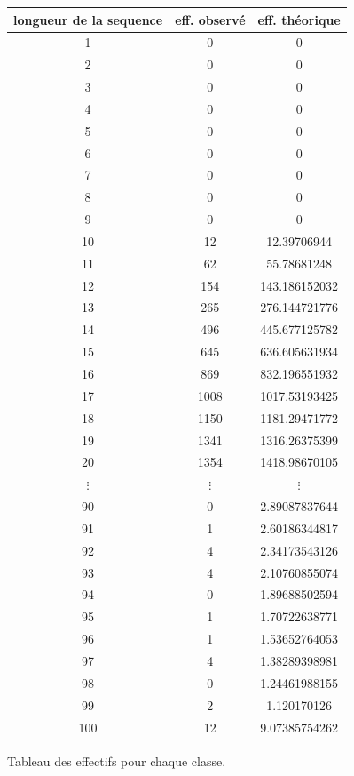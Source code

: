 \documentclass[10pt,a4paper]{article}
\begin{document}
\begin{figure}[H]
\begin{center}
\begin{longtable}{|c|c|c|}
\hline
longueur de la sequence & eff. observé & eff. théorique\\
\hline
1 & 0 & 0 \\
2 & 0 & 0 \\
3 & 0 & 0 \\
4 & 0 & 0 \\
5 & 0 & 0 \\
6 & 0 & 0 \\
7 & 0 & 0 \\
8 & 0 & 0 \\
9 & 0 &0\\
10 & 12 & 12.39706944\\
11 & 62 & 55.78681248\\
12 & 154 & 143.186152032\\
13& 265 & 276.144721776\\
14& 496 & 445.677125782\\
15& 645 & 636.605631934\\
16& 869 & 832.196551932\\
17& 1008 & 1017.53193425\\
18& 1150 & 1181.29471772\\
19 & 1341 & 1316.26375399\\
20 & 1354 & 1418.98670105\\
$\vdots$ & $\vdots$ & $\vdots$ \\ 
90 & 0 & 2.89087837644\\
91 & 1 & 2.60186344817\\
92 & 4 & 2.34173543126\\
93 & 4 & 2.10760855074\\
94& 0 & 1.89688502594\\
95 & 1 & 1.70722638771\\
96 & 1 & 1.53652764053\\
97 & 4 & 1.38289398981\\
98 & 0 & 1.24461988155\\
99 & 2 & 1.120170126\\
100 & 12 & 9.07385754262\\
\hline
\end{longtable}
\end{center}
\caption{Tableau des effectifs pour chaque classe.}
\end{figure}
\end{document}
